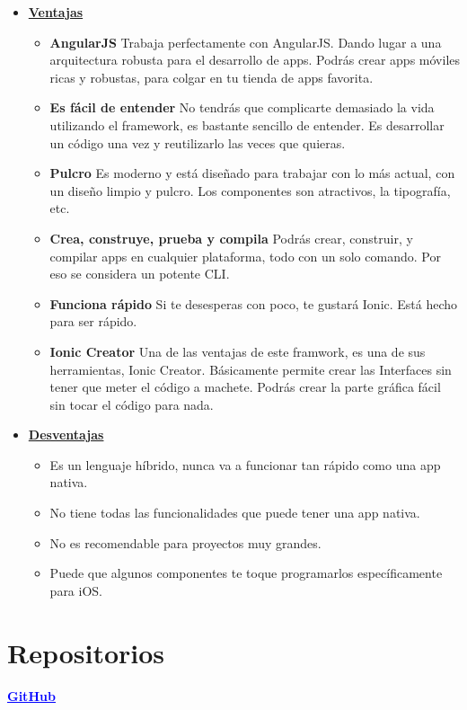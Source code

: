 \documentclass{article}
\begin{document}
 \begin{itemize}
   \item \textbf{\underline{Ventajas}}
    \begin{itemize}
\item \textbf{AngularJS}
Trabaja perfectamente con AngularJS. Dando lugar a una arquitectura robusta para el desarrollo de apps. Podrás crear apps móviles ricas y robustas, para colgar en tu tienda de apps favorita.
    \item \textbf{Es fácil de entender}
    No tendrás que complicarte demasiado la vida utilizando el framework, es bastante sencillo de entender. Es desarrollar un código una vez y reutilizarlo las veces que quieras.
    \item \textbf{Pulcro}
    Es moderno y está diseñado para trabajar con lo más actual, con un diseño limpio y pulcro. Los componentes son atractivos, la tipografía, etc.
    \item \textbf{Crea, construye, prueba y compila}
    Podrás crear, construir, y compilar apps en cualquier plataforma, todo con un solo comando. Por eso se considera un potente CLI.
    \item \textbf{Funciona rápido}
    Si te desesperas con poco, te gustará Ionic. Está hecho para ser rápido.
    \item \textbf{Ionic Creator}
    Una de las ventajas de este framwork, es una de sus herramientas, Ionic Creator. Básicamente permite crear las Interfaces sin tener que meter el código a machete. Podrás crear la parte gráfica fácil sin tocar el código para nada.
    \end{itemize}
    \item \textbf{\underline{Desventajas}}
    \begin{itemize}
        \item Es un lenguaje híbrido, nunca va a funcionar tan rápido como una app nativa.
        \item No tiene todas las funcionalidades que puede tener una app nativa.
        \item No es recomendable para proyectos muy grandes.
        \item Puede que algunos componentes te toque programarlos específicamente para iOS.
    \end{itemize}
 \end{itemize}

\section{Repositorios}
\begin{center}
    \href{https://github.com/Nestorbd/Full-Stack-Proyect}{\textbf{\textcolor{blue}{\underline{GitHub}}}}
\end{center}
\end{document}
